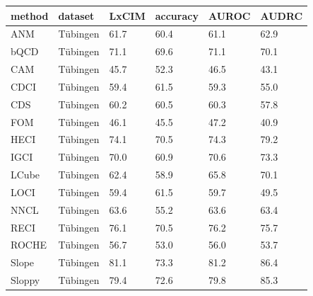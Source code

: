 \begin{tabular}{llllll}
\toprule
method & dataset & LxCIM & accuracy & AUROC & AUDRC \\
\midrule
ANM & Tübingen & 61.7 & 60.4 & 61.1 & 62.9 \\
bQCD & Tübingen & 71.1 & 69.6 & 71.1 & 70.1 \\
CAM & Tübingen & 45.7 & 52.3 & 46.5 & 43.1 \\
CDCI & Tübingen & 59.4 & 61.5 & 59.3 & 55.0 \\
CDS & Tübingen & 60.2 & 60.5 & 60.3 & 57.8 \\
FOM & Tübingen & 46.1 & 45.5 & 47.2 & 40.9 \\
HECI & Tübingen & 74.1 & 70.5 & 74.3 & 79.2 \\
IGCI & Tübingen & 70.0 & 60.9 & 70.6 & 73.3 \\
LCube & Tübingen & 62.4 & 58.9 & 65.8 & 70.1 \\
LOCI & Tübingen & 59.4 & 61.5 & 59.7 & 49.5 \\
NNCL & Tübingen & 63.6 & 55.2 & 63.6 & 63.4 \\
RECI & Tübingen & 76.1 & 70.5 & 76.2 & 75.7 \\
ROCHE & Tübingen & 56.7 & 53.0 & 56.0 & 53.7 \\
Slope & Tübingen & 81.1 & 73.3 & 81.2 & 86.4 \\
Sloppy & Tübingen & 79.4 & 72.6 & 79.8 & 85.3 \\
\bottomrule
\end{tabular}
